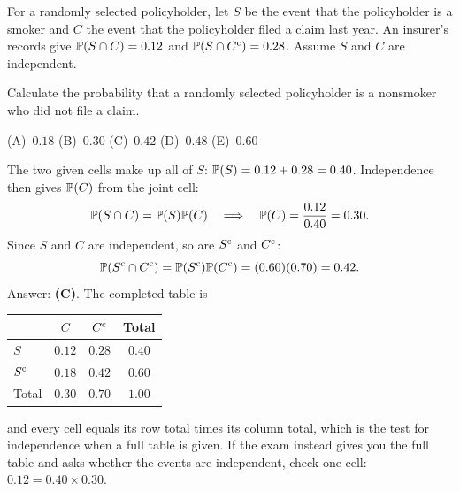 \begin{example}
For a randomly selected policyholder, let $S$ be the event that the policyholder is a smoker and $C$ the event that the policyholder filed a claim last year. An insurer's records give $\mathbb{P}(S \cap C) = 0.12$ and $\mathbb{P}(S \cap C^{\mathrm{c}}) = 0.28$. Assume $S$ and $C$ are independent.

Calculate the probability that a randomly selected policyholder is a nonsmoker who did not file a claim.

\begin{center}
(A)~$0.18$ \quad (B)~$0.30$ \quad (C)~$0.42$ \quad (D)~$0.48$ \quad (E)~$0.60$
\end{center}
\end{example}
\begin{solution}
The two given cells make up all of $S$: $\mathbb{P}(S) = 0.12 + 0.28 = 0.40$. Independence then gives $\mathbb{P}(C)$ from the joint cell:
\[
\mathbb{P}(S \cap C) = \mathbb{P}(S)\mathbb{P}(C) \quad\Longrightarrow\quad \mathbb{P}(C) = \frac{0.12}{0.40} = 0.30.
\]
Since $S$ and $C$ are independent, so are $S^{\mathrm{c}}$ and $C^{\mathrm{c}}$:
\[
\mathbb{P}(S^{\mathrm{c}} \cap C^{\mathrm{c}}) = \mathbb{P}(S^{\mathrm{c}})\mathbb{P}(C^{\mathrm{c}}) = (0.60)(0.70) = 0.42.
\]
Answer: \textbf{(C)}. The completed table is
\begin{center}
\begin{tabular}{@{}lccc@{}}
\toprule
 & $C$ & $C^{\mathrm{c}}$ & Total \\
\midrule
$S$        & $0.12$ & $0.28$ & $0.40$ \\
$S^{\mathrm{c}}$   & $0.18$ & $0.42$ & $0.60$ \\
\midrule
Total      & $0.30$ & $0.70$ & $1.00$ \\
\bottomrule
\end{tabular}
\end{center}
and every cell equals its row total times its column total, which is the test for independence when a full table is given. If the exam instead gives you the full table and asks whether the events are independent, check one cell: $0.12 = 0.40 \times 0.30$.
\end{solution}


